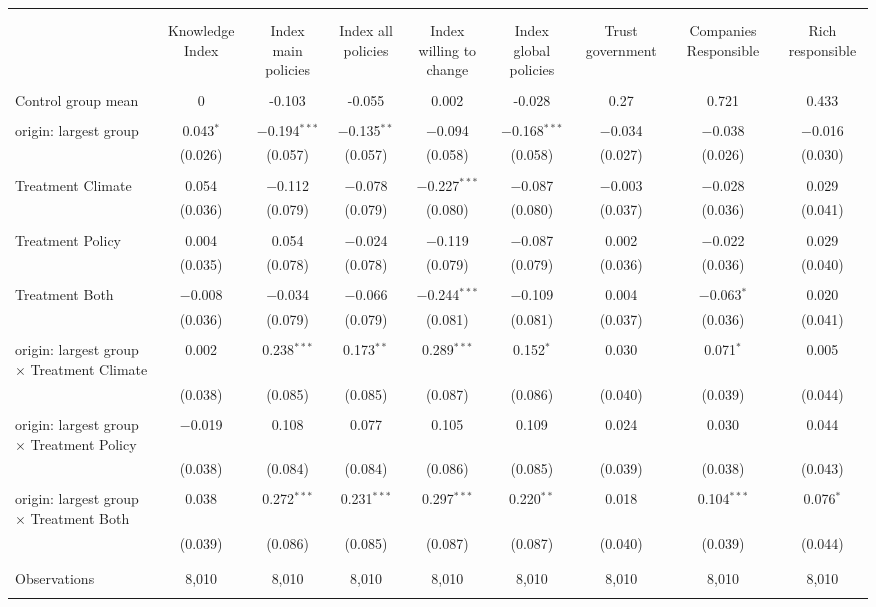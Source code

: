 
\begin{tabular}{@{\extracolsep{5pt}}lcccccccc} 
\\[-1.8ex]\hline 
\hline \\[-1.8ex] 
\\[-1.8ex] & Knowledge Index & Index main policies & Index all policies & Index willing to change & Index global policies & Trust government & Companies Responsible & Rich responsible \\ 
\hline \\[-1.8ex] 
 Control group mean & 0 & -0.103 & -0.055 & 0.002 & -0.028 & 0.27 & 0.721 & 0.433  \\ \hline \\[-1.8ex] origin: largest group & 0.043$^{*}$ & $-$0.194$^{***}$ & $-$0.135$^{**}$ & $-$0.094 & $-$0.168$^{***}$ & $-$0.034 & $-$0.038 & $-$0.016 \\ 
  & (0.026) & (0.057) & (0.057) & (0.058) & (0.058) & (0.027) & (0.026) & (0.030) \\ 
  & & & & & & & & \\ 
 Treatment Climate & 0.054 & $-$0.112 & $-$0.078 & $-$0.227$^{***}$ & $-$0.087 & $-$0.003 & $-$0.028 & 0.029 \\ 
  & (0.036) & (0.079) & (0.079) & (0.080) & (0.080) & (0.037) & (0.036) & (0.041) \\ 
  & & & & & & & & \\ 
 Treatment Policy & 0.004 & 0.054 & $-$0.024 & $-$0.119 & $-$0.087 & 0.002 & $-$0.022 & 0.029 \\ 
  & (0.035) & (0.078) & (0.078) & (0.079) & (0.079) & (0.036) & (0.036) & (0.040) \\ 
  & & & & & & & & \\ 
 Treatment Both & $-$0.008 & $-$0.034 & $-$0.066 & $-$0.244$^{***}$ & $-$0.109 & 0.004 & $-$0.063$^{*}$ & 0.020 \\ 
  & (0.036) & (0.079) & (0.079) & (0.081) & (0.081) & (0.037) & (0.036) & (0.041) \\ 
  & & & & & & & & \\ 
 origin: largest group $\times$ Treatment Climate & 0.002 & 0.238$^{***}$ & 0.173$^{**}$ & 0.289$^{***}$ & 0.152$^{*}$ & 0.030 & 0.071$^{*}$ & 0.005 \\ 
  & (0.038) & (0.085) & (0.085) & (0.087) & (0.086) & (0.040) & (0.039) & (0.044) \\ 
  & & & & & & & & \\ 
 origin: largest group $\times$ Treatment Policy & $-$0.019 & 0.108 & 0.077 & 0.105 & 0.109 & 0.024 & 0.030 & 0.044 \\ 
  & (0.038) & (0.084) & (0.084) & (0.086) & (0.085) & (0.039) & (0.038) & (0.043) \\ 
  & & & & & & & & \\ 
 origin: largest group $\times$ Treatment Both & 0.038 & 0.272$^{***}$ & 0.231$^{***}$ & 0.297$^{***}$ & 0.220$^{**}$ & 0.018 & 0.104$^{***}$ & 0.076$^{*}$ \\ 
  & (0.039) & (0.086) & (0.085) & (0.087) & (0.087) & (0.040) & (0.039) & (0.044) \\ 
  & & & & & & & & \\ 
\hline \\[-1.8ex] 

Observations & 8,010 & 8,010 & 8,010 & 8,010 & 8,010 & 8,010 & 8,010 & 8,010 \\ 
\hline 
\hline \\[-1.8ex] 
\end{tabular} 